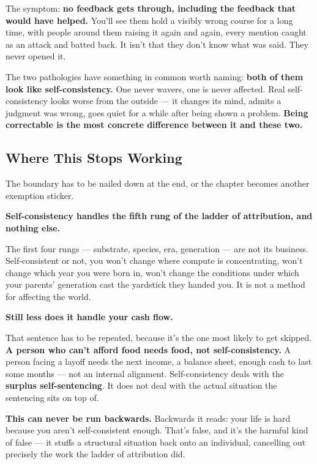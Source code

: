 \documentclass[11pt,a4paper]{article}
\begin{document}
The symptom: \textbf{no feedback gets through, including the feedback that would have helped.} You'll see them hold a visibly wrong course for a long time, with people around them raising it again and again, every mention caught as an attack and batted back. It isn't that they don't know what was said. They never opened it.

The two pathologies have something in common worth naming: \textbf{both of them look like self-consistency.} One never wavers, one is never affected. Real self-consistency looks worse from the outside --- it changes its mind, admits a judgment was wrong, goes quiet for a while after being shown a problem. \textbf{Being correctable is the most concrete difference between it and these two.}

\subsection{Where This Stops Working}

The boundary has to be nailed down at the end, or the chapter becomes another exemption sticker.

\textbf{Self-consistency handles the fifth rung of the ladder of attribution, and nothing else.}

The first four rungs --- substrate, species, era, generation --- are not its business. Self-consistent or not, you won't change where compute is concentrating, won't change which year you were born in, won't change the conditions under which your parents' generation cast the yardstick they handed you. It is not a method for affecting the world.

\textbf{Still less does it handle your cash flow.}

That sentence has to be repeated, because it's the one most likely to get skipped. \textbf{A person who can't afford food needs food, not self-consistency.} A person facing a layoff needs the next income, a balance sheet, enough cash to last some months --- not an internal alignment. Self-consistency deals with the \textbf{surplus self-sentencing}. It does not deal with the actual situation the sentencing sits on top of.

\textbf{This can never be run backwards.} Backwards it reads: your life is hard because you aren't self-consistent enough. That's false, and it's the harmful kind of false --- it stuffs a structural situation back onto an individual, cancelling out precisely the work the ladder of attribution did.
\end{document}
